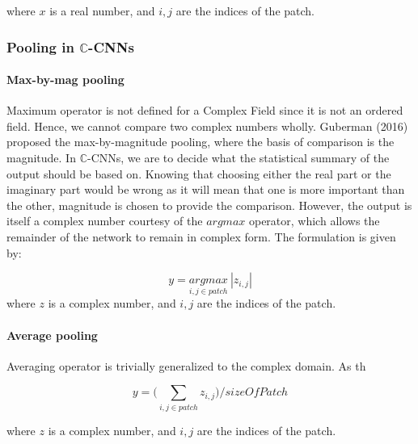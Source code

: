  where $x$ is a real number, and $i,j$ are the indices of the patch.
 \subsubsection{Pooling in $\mathbb{C}$-CNNs}
 \paragraph{Max-by-mag pooling}
 Maximum operator is not defined for a Complex Field since it is not an ordered field. Hence, we cannot compare two complex numbers wholly. Guberman (2016) \cite{Guberman} proposed the max-by-magnitude pooling, where the basis of comparison is the magnitude. In $\mathbb{C}$-CNNs, we are to decide what the statistical summary of the output should be based on. Knowing that choosing either the real part or the imaginary part would be wrong as it will mean that one is more important than the other, magnitude is chosen to provide the comparison. However, the output is itself a complex number courtesy of the $argmax$ operator, which allows the remainder of the network to remain in complex form. The formulation is given by:
 

 
\begin{equation}
y = \underset{i,j \in patch}{argmax} \ |z_{i,j}|
\end{equation}
 where $z$ is a complex number, and $i,j$ are the indices of the patch.
\paragraph{Average pooling}
Averaging operator is trivially generalized to the complex domain. As th  
 
 
  \begin{equation}
 y = \bigg(\underset{i,j \in patch}{\sum} z_{i,j} \bigg)/ sizeOfPatch
 \end{equation}
 
 where $z$ is a complex number, and $i,j$ are the indices of the patch.
 
 
 
